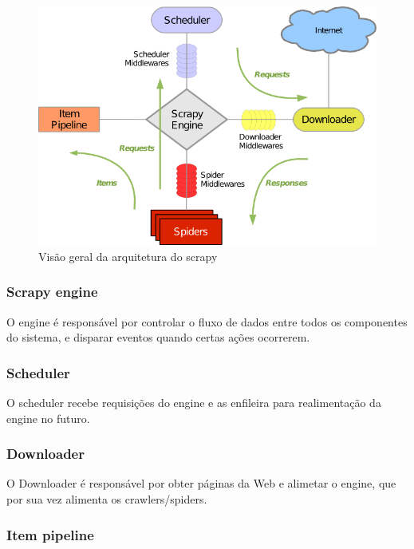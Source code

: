 \begin{figure} [ht]
	\centering
	\includegraphics[scale=1]{scrapy_architecture.png}
	\caption{Visão geral da arquitetura do scrapy \cite{scrapy_arch}}
	\label{scrapy_architecture}
\end{figure}

\subsubsection{Scrapy engine}

O engine é responsável por controlar o fluxo de dados entre todos os componentes do sistema, e disparar eventos quando certas ações ocorrerem.

\subsubsection{Scheduler}

O scheduler recebe requisições do engine e as enfileira para realimentação da engine no futuro.

\subsubsection{Downloader}

O Downloader é responsável por obter páginas da Web e alimetar o engine, que por sua vez alimenta os crawlers/spiders.

\subsubsection{Item pipeline}

